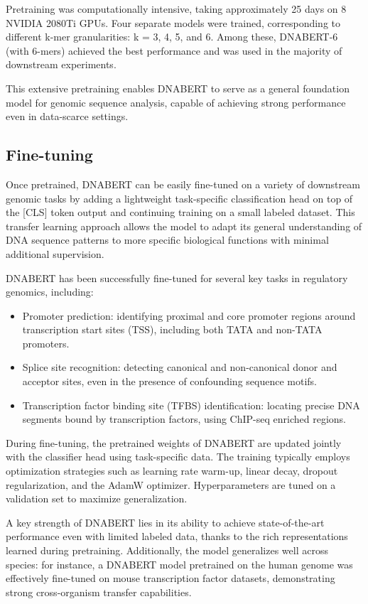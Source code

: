 Pretraining was computationally intensive, taking approximately 25 days on 8 NVIDIA 2080Ti GPUs. Four separate models were trained, corresponding to different k-mer granularities: k = 3, 4, 5, and 6. Among these, DNABERT-6 (with 6-mers) achieved the best performance and was used in the majority of downstream experiments.

This extensive pretraining enables DNABERT to serve as a general foundation model for genomic sequence analysis, capable of achieving strong performance even in data-scarce settings.

\subsection{Fine-tuning}

Once pretrained, DNABERT can be easily fine-tuned on a variety of downstream genomic tasks by adding a lightweight task-specific classification head on top of the [CLS] token output and continuing training on a small labeled dataset. This transfer learning approach allows the model to adapt its general understanding of DNA sequence patterns to more specific biological functions with minimal additional supervision.

DNABERT has been successfully fine-tuned for several key tasks in regulatory genomics, including:
\begin{itemize}
    \item Promoter prediction: identifying proximal and core promoter regions around transcription start sites (TSS), including both TATA and non-TATA promoters.

    \item Splice site recognition: detecting canonical and non-canonical donor and acceptor sites, even in the presence of confounding sequence motifs.

    \item Transcription factor binding site (TFBS) identification: locating precise DNA segments bound by transcription factors, using ChIP-seq enriched regions.
\end{itemize}

During fine-tuning, the pretrained weights of DNABERT are updated jointly with the classifier head using task-specific data. The training typically employs optimization strategies such as learning rate warm-up, linear decay, dropout regularization, and the AdamW optimizer. Hyperparameters are tuned on a validation set to maximize generalization.

A key strength of DNABERT lies in its ability to achieve state-of-the-art performance even with limited labeled data, thanks to the rich representations learned during pretraining. Additionally, the model generalizes well across species: for instance, a DNABERT model pretrained on the human genome was effectively fine-tuned on mouse transcription factor datasets, demonstrating strong cross-organism transfer capabilities.

